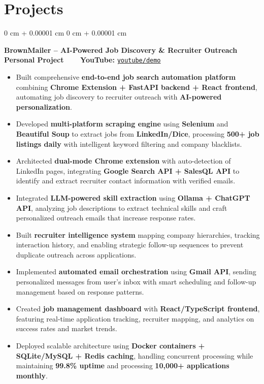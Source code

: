 \documentclass[10pt, letterpaper]{article}
\newenvironment{highlights}{
    \begin{itemize}[
        topsep=0.10 cm,
        parsep=0.10 cm,
        partopsep=0pt,
        itemsep=0pt,
        leftmargin=0 cm + 10pt
    ]
}{
    \end{itemize}
} %
\newenvironment{onecolentry}{
    \begin{adjustwidth}{
        0 cm + 0.00001 cm
    }{
        0 cm + 0.00001 cm
    }
}{
    \end{adjustwidth}
} %
\begin{document}
\section{Projects}
\vspace{0.05 cm}


\begin{onecolentry}
	\textbf{BrownMailer – AI-Powered Job Discovery \& Recruiter Outreach} \hfill \textbf{Personal Project} \ \ \ \ \textbf{YouTube:} \href{https://www.youtube.com/watch?v=mUitmexEZ70}{\texttt{youtube/demo}}
	\begin{highlights}
		\item Built comprehensive \textbf{end-to-end job search automation platform} combining \textbf{Chrome Extension + FastAPI backend + React frontend}, automating job discovery to recruiter outreach with \textbf{AI-powered personalization}.
		\item Developed \textbf{multi-platform scraping engine} using \textbf{Selenium} and \textbf{Beautiful Soup} to extract jobs from \textbf{LinkedIn/Dice}, processing \textbf{500+ job listings daily} with intelligent keyword filtering and company blacklists.
		\item Architected \textbf{dual-mode Chrome extension} with auto-detection of LinkedIn pages, integrating \textbf{Google Search API + SalesQL API} to identify and extract recruiter contact information with verified emails.
		\item Integrated \textbf{LLM-powered skill extraction} using \textbf{Ollama + ChatGPT API}, analyzing job descriptions to extract technical skills and craft personalized outreach emails that increase response rates.
		\item Built \textbf{recruiter intelligence system} mapping company hierarchies, tracking interaction history, and enabling strategic follow-up sequences to prevent duplicate outreach across applications.
		\item Implemented \textbf{automated email orchestration} using \textbf{Gmail API}, sending personalized messages from user's inbox with smart scheduling and follow-up management based on response patterns.
		\item Created \textbf{job management dashboard} with \textbf{React/TypeScript frontend}, featuring real-time application tracking, recruiter mapping, and analytics on success rates and market trends.
		\item Deployed scalable architecture using \textbf{Docker containers + SQLite/MySQL + Redis caching}, handling concurrent processing while maintaining \textbf{99.8\% uptime} and processing \textbf{10,000+ applications monthly}.
	\end{highlights}
\end{onecolentry}
\end{document}
